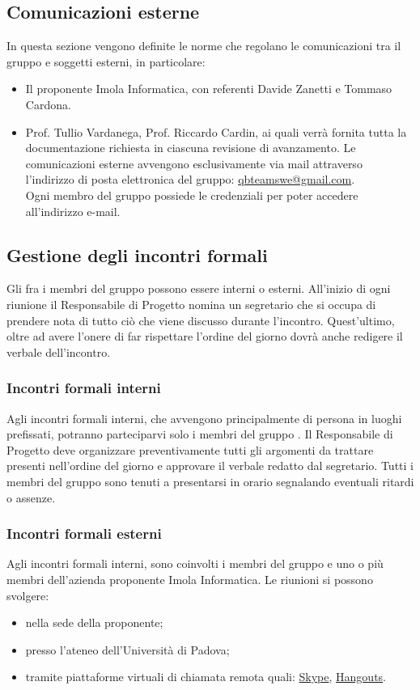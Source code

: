 \subsection{Comunicazioni esterne}
In questa sezione vengono definite le norme che regolano le comunicazioni tra il gruppo e soggetti esterni, in particolare:
\begin{itemize}
	\item Il proponente Imola Informatica, con referenti Davide Zanetti e Tommaso Cardona.
	\item Prof. Tullio Vardanega, Prof. Riccardo Cardin, ai quali verrà fornita tutta la documentazione richiesta in ciascuna revisione di avanzamento.
	Le comunicazioni esterne avvengono esclusivamente via mail attraverso l’indirizzo di posta elettronica del gruppo:
	\url{qbteamswe@gmail.com}. \\
	Ogni membro del gruppo possiede le credenziali per poter accedere all’indirizzo e-mail.
\end{itemize}
	
\subsection{Gestione degli incontri formali}
Gli  fra i membri del gruppo possono essere interni o esterni.
All’inizio di ogni riunione il Responsabile di Progetto nomina un segretario che si occupa di prendere nota di tutto ciò che viene discusso durante l’incontro.
Quest’ultimo, oltre ad avere l’onere di far rispettare l’ordine del giorno dovrà anche redigere il verbale dell’incontro.

\subsubsection{Incontri formali interni}
Agli incontri formali interni, che avvengono principalmente di persona in luoghi prefissati, potranno parteciparvi solo i membri del gruppo \Gruppo.
Il Responsabile di Progetto deve organizzare preventivamente tutti gli argomenti da trattare presenti nell’ordine del giorno e approvare il verbale redatto dal segretario.
Tutti i membri del gruppo sono tenuti a presentarsi in orario segnalando eventuali ritardi o assenze.

\subsubsection{Incontri formali esterni}
Agli incontri formali interni, sono coinvolti i membri del gruppo \Gruppo e uno o più membri dell'azienda proponente Imola Informatica.
Le riunioni si possono svolgere:
\begin{itemize}
	\item nella sede della proponente;
	\item presso l’ateneo dell’Università di Padova;
	\item tramite piattaforme virtuali di chiamata remota quali: \href{https://www.skype.com/it/}{Skype}, \href{https://hangouts.google.com/}{Hangouts}.
\end{itemize}

